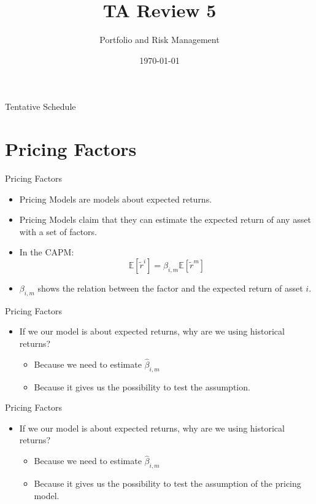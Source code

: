 \documentclass{beamer}
\title{TA Review 5}
\author{Portfolio and Risk Management}
\date{\today}
\begin{document}
\begin{frame}
    \titlepage
\end{frame}

\begin{frame}{Tentative Schedule}
    \tableofcontents
\end{frame}

\section{Pricing Factors}
\begin{frame}{Pricing Factors}
    \begin{itemize}
        \item Pricing Models are models about expected returns.
        \item Pricing Models claim that they can estimate the expected return of any asset with a set of factors.
        \item In the CAPM:
        $$
        \mathbb{E}[\tilde{r}^i] = \beta_{i, m} \mathbb{E}[\tilde{r}^m] 
        $$
        \item $\beta_{i, m}$ shows the relation between the factor and the expected return of asset $i$.
    \end{itemize}
\end{frame}

\begin{frame}{Pricing Factors}
    \begin{itemize}
        \item If we our model is about expected returns, why are we using historical returns?
        \begin{itemize}
            \item Because we need to estimate $\hat{\beta}_{i, m}$
            \item Because it gives us the possibility to test the assumption.
        \end{itemize}
    \end{itemize}
\end{frame}

\begin{frame}{Pricing Factors}
    \begin{itemize}
        \item If we our model is about expected returns, why are we using historical returns?
        \begin{itemize}
            \item Because we need to estimate $\hat{\beta}_{i, m}$
            \item Because it gives us the possibility to test the assumption of the pricing model.
        \end{itemize}
    \end{itemize}
\end{frame}
\end{document}
